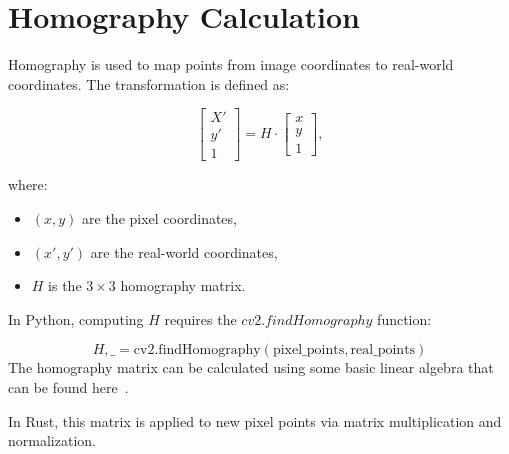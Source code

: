 \section{Homography Calculation}\label{sec:homography-calculation}

Homography is used to map points from image coordinates to real-world coordinates.
The transformation is defined as:

\begin{equation}
    \begin{bmatrix}
        X' \\
        y' \\
        1
    \end{bmatrix}
    = H \cdot
    \begin{bmatrix}
        x \\
        y \\
        1
    \end{bmatrix},
    \label{eq:homography}
\end{equation}

where:
\begin{itemize}
    \item \( (x, y) \) are the pixel coordinates,
    \item \( (x', y') \) are the real-world coordinates,
    \item \( H \) is the \( 3 \times 3 \) homography matrix.
\end{itemize}

In Python, computing \( H \) requires the $cv2.findHomography$ function:


\[
    H, \text{\_} = \text{cv2.findHomography}(\text{pixel\_points}, \text{real\_points})
\]
The homography matrix can be calculated using some basic linear algebra that can be found here~\autocite{homography}.

In Rust, this matrix is applied to new pixel points via matrix multiplication and normalization.


